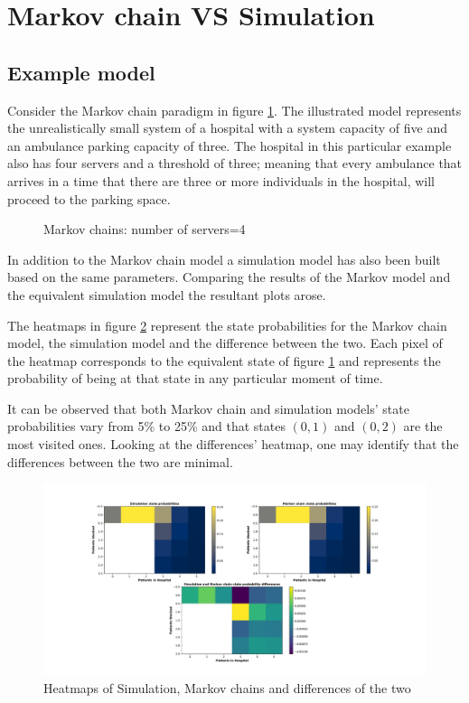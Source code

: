 \section{Markov chain VS Simulation}

\subsection{Example model}
Consider the Markov chain paradigm in figure \ref{Model_mini}. The illustrated model represents the unrealistically small system of a hospital with a system capacity of five and an ambulance parking capacity of three. The hospital in this particular example also has four servers and a threshold of three; meaning that every ambulance that arrives in a time that there are three or more individuals in the hospital, will proceed to the parking space.

\begin{figure}[h]
    \centering
    
    \caption{Markov chains: number of servers=4} 
    \label{Model_mini}
\end{figure}

In addition to the Markov chain model a simulation model has also been built based on the same parameters. Comparing the results of the Markov model and the equivalent simulation model the resultant plots arose.

The heatmaps in figure \ref{Heatmap_mini} represent the state probabilities for the Markov chain model, the simulation model and the difference between the two. Each pixel of the heatmap corresponds to the equivalent state of figure \ref{Model_mini} and represents the probability of being at that state in any particular moment of time.

It can be observed that both Markov chain and simulation models' state probabilities vary from 5\% to 25\% and that states \( (0, 1) \) and \( (0, 2) \) are the most visited ones. Looking at the differences' heatmap, one may identify that the differences between the two are minimal.

\newpage

\begin{figure}[h]
    \includegraphics[width=\linewidth]{Comparisons/Example_model/Heatmap/main.pdf}
    \caption{Heatmaps of Simulation, Markov chains and differences of the two}
    \label{Heatmap_mini}
\end{figure}



